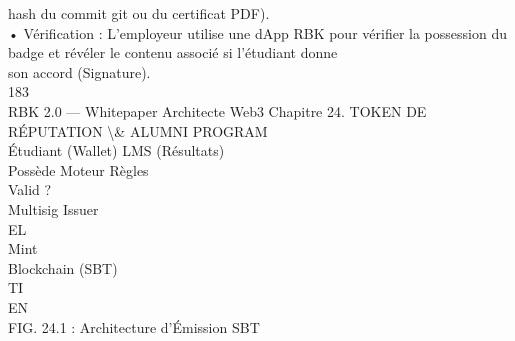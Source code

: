 \documentclass[12pt,landscape,a4paper]{article}
\begin{document}
hash du commit git ou du certificat PDF).\\
\vspace{0.5em}
• Vérification : L’employeur utilise une dApp RBK pour vérifier la possession du badge et révéler le contenu associé si l’étudiant donne\\
son accord (Signature).\\
\vspace{0.5em}
\vspace{0.5em}
\vspace{0.5em}
\vspace{0.5em}
183\\
RBK 2.0 — Whitepaper Architecte Web3                                                   Chapitre 24. TOKEN DE RÉPUTATION \textbackslash{}& ALUMNI PROGRAM\\
\vspace{0.5em}
\vspace{0.5em}
\vspace{0.5em}
Étudiant (Wallet)                 LMS (Résultats)\\
\vspace{0.5em}
\vspace{0.5em}
\vspace{0.5em}
\vspace{0.5em}
Possède                            Moteur Règles\\
\vspace{0.5em}
\vspace{0.5em}
Valid ?\\
\vspace{0.5em}
\vspace{0.5em}
Multisig Issuer\\
\vspace{0.5em}
\vspace{0.5em}
\vspace{0.5em}
\vspace{0.5em}
EL\\
Mint\\
Blockchain (SBT)\\
\vspace{0.5em}
\vspace{0.5em}
\vspace{0.5em}
\vspace{0.5em}
TI\\
EN\\
FIG. 24.1 : Architecture d’Émission SBT\\
\vspace{0.5em}
\vspace{0.5em}
\end{document}
